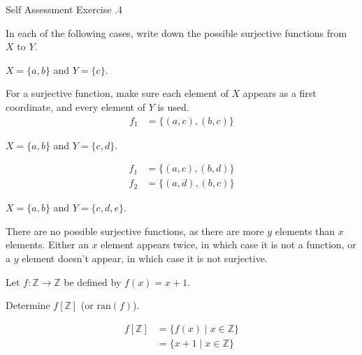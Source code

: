 \documentclass[\main/notes.tex]{subfiles}
\begin{document}
			\begin{exercise}{Self Assessment Exercise \thechapter.4}
				\begin{questions}
					\item In each of the following cases, write down the possible surjective functions from $X$ to $Y$.
						\begin{questions}
							\item $X = \{a, b\}$ and $Y = \{c\}$.\\
								\begin{answer}
									For a surjective function, make sure each element of $X$ appears as a first coordinate, and every element of $Y$ is used.
									\begin{align*}
										f_{1} &= \bigl\{(a, c), (b, c)\bigr\}
									\end{align*}
								\end{answer}
							\item $X = \{a, b\}$ and $Y = \{c, d\}$.
								\begin{answer}
									\begin{align*}
										f_{1} &= \bigl\{(a, c), (b, d)\bigr\}\\
										f_{2} &= \bigl\{(a, d), (b, c)\bigr\}
									\end{align*}
								\end{answer}
							\item $X = \{a, b\}$ and $Y = \{c, d, e\}$.\\
								\begin{answer}
									There are no possible surjective functions, as there are more $y$ elements than $x$ elements. Either an $x$ element appears twice, in which case it is not a function, or a $y$ element doesn't appear, in which case it is not surjective.
								\end{answer}
						\end{questions}
					\item Let $f: \mathbb{Z} \rightarrow \mathbb{Z}$ be defined by $f(x) = x + 1$.
						\begin{questions}
							\item Determine $f[\mathbb{Z}]$ (or $\mathrm{ran}(f)$).
								\begin{answer}
									\begin{align*}
										f[\mathbb{Z}] &= \{f(x) \mid x \in \mathbb{Z}\}\\
										&= \{x + 1 \mid x \in \mathbb{Z}\} \tag*{$(y = x + 1 \Rightarrow x = y - 1)$}\\

\end{align*}
\end{answer}
\end{questions}
\end{questions}
\end{exercise}
\end{document}
